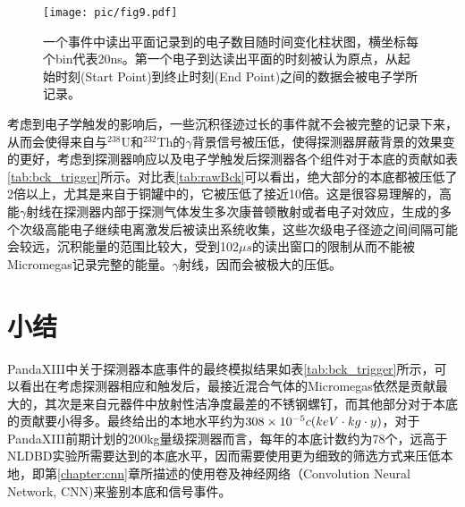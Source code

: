 \begin{figure}
    \centering
    \texttt{[image: pic/fig9.pdf]}
    \caption{一个事件中读出平面记录到的电子数目随时间变化柱状图，横坐标每个bin代表20ns。第一个电子到达读出平面的时刻被认为原点，从起始时刻(Start Point)到终止时刻(End Point)之间的数据会被电子学所记录。}
    \label{fig:trigger}
\end{figure}

考虑到电子学触发的影响后，一些沉积径迹过长的事件就不会被完整的记录下来，从而会使得来自与$^{238}$U和$^{232}$Th的$\gamma$背景信号被压低，使得探测器屏蔽背景的效果变的更好，考虑到探测器响应以及电子学触发后探测器各个组件对于本底的贡献如表\ref{tab:bck_trigger}所示。对比表\ref{tab:rawBck}可以看出，绝大部分的本底都被压低了2倍以上，尤其是来自于铜罐中的，它被压低了接近10倍。这是很容易理解的，高能$\gamma$射线在探测器内部于探测气体发生多次康普顿散射或者电子对效应，生成的多个次级高能电子继续电离激发后被读出系统收集，这些次级电子径迹之间间隔可能会较远，沉积能量的范围比较大，受到102$\mu s$的读出窗口的限制从而不能被Micromegas记录完整的能量。$\gamma$射线，因而会被极大的压低。

\section{小结}

PandaXIII中关于探测器本底事件的最终模拟结果如表\ref{tab:bck_trigger}所示，可以看出在考虑探测器相应和触发后，最接近混合气体的Micromegas依然是贡献最大的，其次是来自元器件中放射性洁净度最差的不锈钢螺钉，而其他部分对于本底的贡献要小得多。最终给出的本地水平约为$308\times 10^{-5}c\/(keV\cdot kg\cdot y)$，对于PandaXIII前期计划的200kg量级探测器而言，每年的本底计数约为78个，远高于NLDBD实验所需要达到的本底水平，因而需要使用更为细致的筛选方式来压低本地，即第\ref{chapter:cnn}章所描述的使用卷及神经网络（Convolution Neural Network, CNN)来鉴别本底和信号事件。

